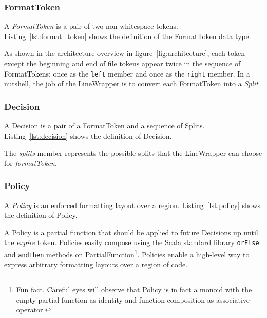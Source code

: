\subsubsection{FormatToken}
A \emph{FormatToken} is a pair of two non-whitespace tokens.
Listing~\ref{lst:format_token} shows the definition of the FormatToken data type.

As shown in the architecture overview in figure~\ref{fig:architecture}, each token except the beginning and end of file tokens appear twice in the sequence of FormatTokens: once as the \texttt{left} member and once as the \texttt{right} member.
In a nutshell, the job of the LineWrapper is to convert each FormatToken into a \emph{Split}

\subsubsection{Decision}\label{sec:decision}
A Decision is a pair of a FormatToken and a sequence of Splits.
Listing~\ref{lst:decision} shows the definition of Decision.

The \emph{splits} member represents the possible splits that the LineWrapper can choose for \emph{formatToken}.

\subsubsection{Policy}\label{sec:policy}
A \emph{Policy} is an enforced formatting layout over a region.
Listing~\ref{lst:policy} shows the definition of Policy.
\begin{minipage}{\linewidth}
  
\end{minipage}
A Policy is a partial function that should be applied to future Decisions up until the \emph{expire} token.
Policies easily compose using the Scala standard library \texttt{orElse} and \texttt{andThen} methods on PartialFunction\footnote{
  Fun fact. Careful eyes will observe that Policy is in fact a monoid with the empty partial function as identity and function composition as associative operator.}.
Policies enable a high-level way to express arbitrary formatting layouts over a region of code.

